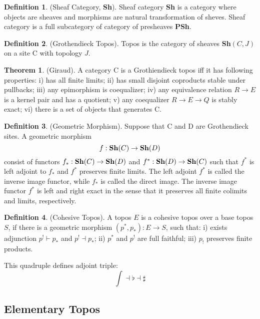 \documentclass{article}
\theoremstyle{definition}
\newtheorem{definition}{Definition}
\newtheorem{theorem}{Theorem}
\begin{document}
\begin{definition} (Sheaf Category, {\bf Sh}).
Sheaf category {\bf Sh}
is a category where objects are sheaves and morphisms are
natural transformation of sheves. Sheaf category is a full subcategory
of category of presheaves {\bf PSh}.
\end{definition}

\begin{definition} (Grothendieck Topos).
Topos is the category of sheaves {\bf Sh}$(C,J)$ on a site $\mathrm{C}$ with topology $J$.
\end{definition}

\begin{theorem} (Giraud).
A category $\mathrm{C}$ is a Grothiendieck topos iff it has following properties:
i) has all finite limits;
ii) has small disjoint coproducts stable under pullbacks;
iii) any epimorphism is coequalizer;
iv) any equivalence relation $R \rightarrow E$ is a kernel pair and has a quotient;
v) any coequalizer $R \rightarrow E \rightarrow Q$ is stably exact;
vi) there is a set of objects that generates $\mathrm{C}$.
\end{theorem}

\begin{definition} (Geometric Morphism). Suppose that $\mathrm{C}$ and $\mathrm{D}$
are Grothendieck sites. A geometric morphism
$$
    f : {\bf Sh}(C) \rightarrow {\bf Sh}(D)
$$
consist of functors $f_* : {\bf Sh}(C) \rightarrow {\bf Sh}(D)$ and
$f^* : {\bf Sh}(D) \rightarrow {\bf Sh}(C)$ such that $f^*$ is
left adjoint to $f_*$ and $f^*$ preserves finite limits. The left adjoint $f^*$ is called
the inverse image functor, while $f_*$ is called the direct image. The inverse image functor
$f^*$ is left and right exact in the sense that it preserves all finite
colimits and limits, respectively.
\end{definition}

\begin{definition} (Cohesive Topos). A topos $E$ is a cohesive topos over a base topos $S$,
if there is a geometric morphism $(p^*,p_*): E \rightarrow S$, such that:
i) exists adjunction $p^! \vdash p_*$ and $ p^! \dashv p_*$;
ii) $p^*$ and $p^!$ are full faithful; iii) $p_!$ preserves finite products.
\end{definition}
This quadruple defines adjoint triple:
$$
\int \dashv \flat \dashv \sharp
$$


\newpage
\subsection{Elementary Topos}
\end{document}
